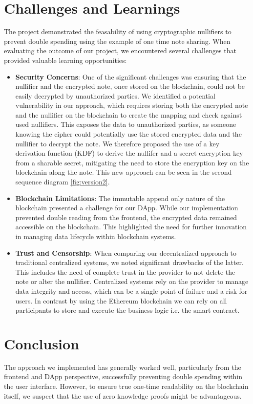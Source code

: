 \documentclass[twocolumn,10pt]{article}
\begin{document}
\section*{Challenges and Learnings}
The project demonstrated the feasability of using cryptographic nullifiers to prevent double spending using the example of one time note sharing.
When evaluating the outcome of our project, we encountered several challenges that provided valuable learning opportunities:
\begin{itemize}
    \item \textbf{Security Concerns}: One of the significant challenges was ensuring that the nullifier and the encrypted note, once stored on the blockchain, could not be easily decrypted by unauthorized parties. We identified a potential vulnerability in our approach, which requires storing both the encrypted note and the nullifier on the blockchain to create the mapping and check against used nullifiers. This exposes the data to unauthorized parties, as someone knowing the cipher could potentially use the stored encrypted data and the nullifier to decrypt the note. We therefore proposed the use of a key derivation function (KDF) to derive the nullifer and a secret encryption key from a sharable secret, mitigating the need to store the encryption key on the blockchain along the note. This new approach can be seen in the second sequence diagram \ref{fig:version2}.
    \item \textbf{Blockchain Limitations}: The immutable append only nature of the blockchain presented a challenge for our DApp. While our implementation prevented double reading from the frontend, the encrypted data remained accessible on the blockchain. This highlighted the need for further innovation in managing data lifecycle within blockchain systems.
    \item \textbf{Trust and Censorship}: When comparing our decentralized approach to traditional centralized systems, we noted significant drawbacks of the latter. This includes the need of complete trust in the provider to not delete the note or alter the nullifier. Centralized systems rely on the provider to manage data integrity and access, which can be a single point of failure and a risk for users. In contrast by using the Ethereum blockchain we can rely on all participants to store and execute the business logic i.e. the smart contract.
\end{itemize}

\section*{Conclusion}
The approach we implemented has generally worked well, particularly from the frontend and DApp perspective, successfully preventing double spending within the user interface. However, to ensure true one-time readability on the blockchain itself, we suspect that the use of zero knowledge proofs might be advantageous.
\end{document}
